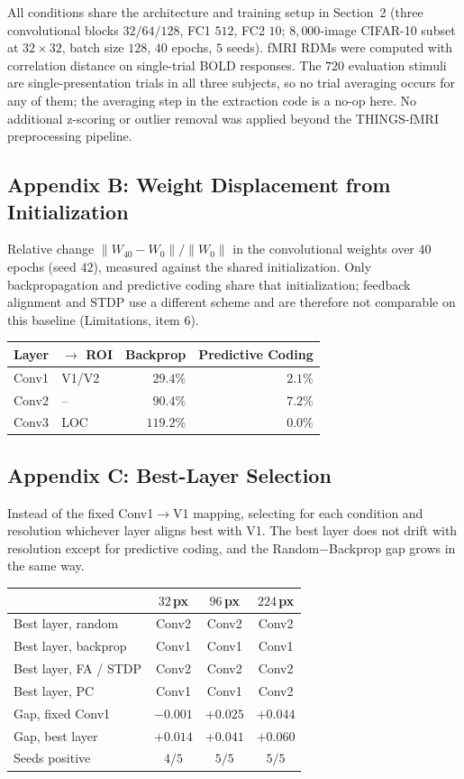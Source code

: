 \documentclass[10pt,twocolumn]{article}
\begin{document}
\noindent All conditions share the architecture and training setup in Section~2 (three convolutional blocks $32/64/128$, FC1 $512$, FC2 $10$; $8{,}000$-image CIFAR-10 subset at $32\times32$, batch size $128$, $40$ epochs, $5$ seeds). fMRI RDMs were computed with correlation distance on single-trial BOLD responses. The $720$ evaluation stimuli are single-presentation trials in all three subjects, so no trial averaging occurs for any of them; the averaging step in the extraction code is a no-op here. No additional z-scoring or outlier removal was applied beyond the THINGS-fMRI preprocessing pipeline.

\subsection*{Appendix B: Weight Displacement from Initialization}

\noindent Relative change $\lVert W_{40} - W_{0}\rVert / \lVert W_{0}\rVert$ in the convolutional weights over $40$ epochs (seed $42$), measured against the shared initialization. Only backpropagation and predictive coding share that initialization; feedback alignment and STDP use a different scheme and are therefore not comparable on this baseline (Limitations, item 6).

\begingroup
\footnotesize
\begin{tabular}{@{}llrr@{}}
\toprule
Layer & $\to$ ROI & Backprop & Predictive Coding \\
\midrule
Conv1 & V1/V2 & $29.4\%$ & $2.1\%$ \\
Conv2 & --    & $90.4\%$ & $7.2\%$ \\
Conv3 & LOC   & $119.2\%$ & $0.0\%$ \\
\bottomrule
\end{tabular}
\endgroup

\subsection*{Appendix C: Best-Layer Selection}

\noindent Instead of the fixed Conv1$\to$V1 mapping, selecting for each condition and resolution whichever layer aligns best with V1. The best layer does not drift with resolution except for predictive coding, and the Random$-$Backprop gap grows in the same way.

\begingroup
\footnotesize
\begin{tabular}{@{}lccc@{}}
\toprule
 & $32$\,px & $96$\,px & $224$\,px \\
\midrule
Best layer, random & Conv2 & Conv2 & Conv2 \\
Best layer, backprop & Conv1 & Conv1 & Conv1 \\
Best layer, FA / STDP & Conv2 & Conv2 & Conv2 \\
Best layer, PC & Conv1 & Conv1 & Conv2 \\
\midrule
Gap, fixed Conv1 & $-0.001$ & $+0.025$ & $+0.044$ \\
Gap, best layer & $+0.014$ & $+0.041$ & $+0.060$ \\
Seeds positive & $4/5$ & $5/5$ & $5/5$ \\
\bottomrule
\end{tabular}
\endgroup
\end{document}
